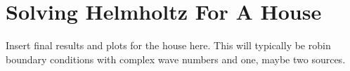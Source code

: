 \documentclass[10pt,a4paper]{article}
\begin{document}
\section*{Solving Helmholtz For A House}
Insert final results and plots for the house here. This will typically be robin boundary conditions with complex wave numbers and one, maybe two sources.
\end{document}
